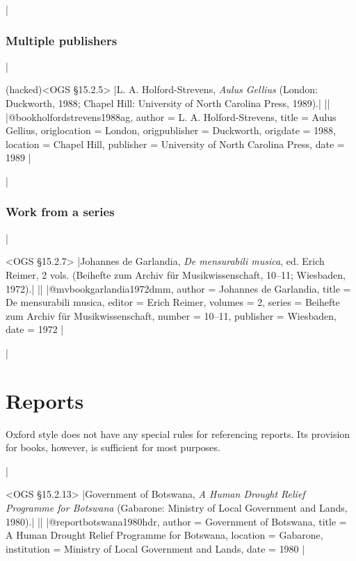 \documentclass[extrafontsizes,11pt,a4paper,oneside]{memoir}
\newcommand*{\lit}[1]{\textsf{#1}}
\begin{document}
\todoc|
\subsection{Multiple publishers}

|

\bibexample(hacked)<OGS \S15.2.5>
|L. A. Holford-Strevens, \emph{Aulus Gellius} (London: Duckworth, 1988; Chapel Hill: University of North Carolina Press, 1989).|%
||%
|@book{holfordstrevens1988ag,
  author = {L. A. Holford-Strevens},
  title = {Aulus Gellius},
  origlocation = {London},
  origpublisher = {Duckworth},
  origdate = {1988},
  location = {Chapel Hill},
  publisher = {University of North Carolina Press},
  date = {1989}
}|

\todoc|
\subsection{Work from a series}


|

\bibexample<OGS \S15.2.7>
|Johannes de Garlandia, \emph{De mensurabili musica}, ed. Erich Reimer, 2 vols. (Beihefte zum Archiv für Musikwissenschaft, 10--11; Wiesbaden, 1972).|%
||%
|@mvbook{garlandia1972dmm,
  author = {Johannes de Garlandia},
  title = {De mensurabili musica},
  editor = {Erich Reimer},
  volumes = {2},
  series = {Beihefte zum Archiv für Musikwissenschaft},
  number = {10--11},
  publisher = {Wiesbaden},
  date = {1972}
}|

\todoc|
\spec{Author, \emph{Title} (nth \lit{ser.}, Year).}

\chapter{Reports}\label{sec:report}

Oxford style does not have any special rules for referencing reports. Its provision for books, however, is sufficient for most purposes.

|

\bibexample<OGS \S15.2.13>
|Government of Botswana, \emph{A Human Drought Relief Programme for Botswana} (Gabarone: Ministry of Local Government and Lands, 1980).|%
||%
|@report{botswana1980hdr,
  author = {{Government of Botswana}},
  title = {A Human Drought Relief Programme for Botswana},
  location = {Gabarone},
  institution = {Ministry of Local Government and Lands},
  date = {1980}
}|
  
\end{document}
